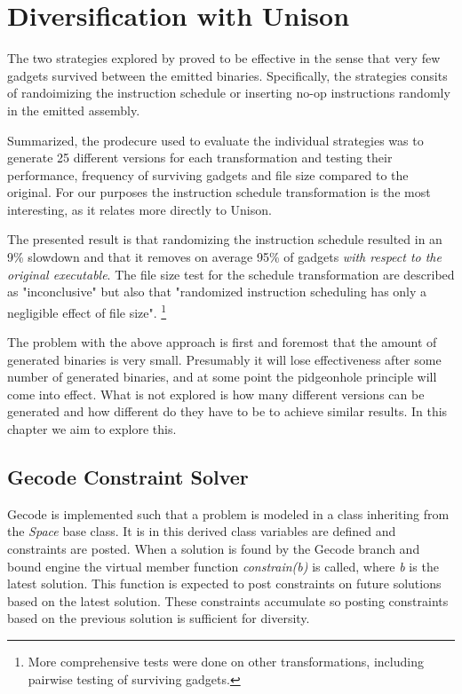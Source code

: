 \chapter{Diversification with Unison}


The two strategies explored by \textcite{large-scale-automated} proved to be effective in
the sense that very few gadgets survived between the emitted binaries. Specifically, the
strategies consits of randoimizing the instruction schedule or inserting no-op instructions
randomly in the emitted assembly.

Summarized, the prodecure \textcite{large-scale-automated} used to evaluate the individual
strategies was to generate 25 different versions for each transformation and testing their
performance, frequency of surviving gadgets and file size compared to the original. For
our purposes the instruction schedule transformation is the most interesting, as it relates
more directly to Unison.

The presented result is that randomizing the instruction schedule resulted in an 9\%
slowdown and that it removes on average 95\% of gadgets \textit{with respect to the original executable}.
The file size test for the schedule transformation are described as "inconclusive" but
also that "randomized instruction scheduling has only a negligible effect of file size".
\footnote{More comprehensive tests were done on other transformations, including pairwise
testing of surviving gadgets.}

The problem with the above approach is first and foremost that the amount of generated
binaries is very small. Presumably it will lose effectiveness after some number of
generated binaries, and at some point the pidgeonhole principle will come into effect.
What is not explored is how many different versions can be generated and how different do
they have to be to achieve similar results. In this chapter we aim to explore this.

\section{Gecode Constraint Solver}

Gecode is implemented such that a problem is modeled in a class inheriting from the
\textit{Space} base class. It is in this derived class variables are defined and constraints
are posted. When a solution is found by the Gecode branch and bound engine the virtual
member function \textit{constrain(b)} is called, where \textit{b} is the latest solution.
This function is expected to post constraints on future solutions based on the latest
solution. These constraints accumulate so posting constraints based on the previous solution
is sufficient for diversity.

